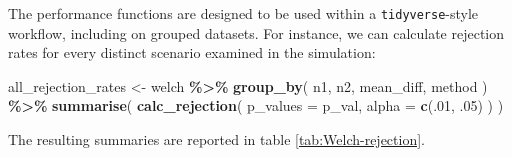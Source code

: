 \documentclass[
]{book}
\newenvironment{Shaded}{\begin{snugshade}}{\end{snugshade}}
\newcommand{\AttributeTok}[1]{\textcolor[rgb]{0.13,0.29,0.53}{#1}}
\newcommand{\DecValTok}[1]{\textcolor[rgb]{0.00,0.00,0.81}{#1}}
\newcommand{\FunctionTok}[1]{\textcolor[rgb]{0.13,0.29,0.53}{\textbf{#1}}}
\newcommand{\NormalTok}[1]{#1}
\newcommand{\OtherTok}[1]{\textcolor[rgb]{0.56,0.35,0.01}{#1}}
\newcommand{\SpecialCharTok}[1]{\textcolor[rgb]{0.81,0.36,0.00}{\textbf{#1}}}
\begin{document}
The performance functions are designed to be used within a \texttt{tidyverse}-style workflow, including on grouped datasets. For instance, we can calculate rejection rates for every distinct scenario examined in the simulation:

\begin{Shaded}
\begin{Highlighting}[]
\NormalTok{all\_rejection\_rates }\OtherTok{\textless{}{-}} 
\NormalTok{  welch }\SpecialCharTok{\%\textgreater{}\%} 
  \FunctionTok{group\_by}\NormalTok{( n1, n2, mean\_diff, method ) }\SpecialCharTok{\%\textgreater{}\%}
  \FunctionTok{summarise}\NormalTok{( }
    \FunctionTok{calc\_rejection}\NormalTok{( }\AttributeTok{p\_values =}\NormalTok{ p\_val, }\AttributeTok{alpha =} \FunctionTok{c}\NormalTok{(.}\DecValTok{01}\NormalTok{, .}\DecValTok{05}\NormalTok{) ) }
\NormalTok{  )}
\end{Highlighting}
\end{Shaded}

The resulting summaries are reported in table \ref{tab:Welch-rejection}.
\end{document}
